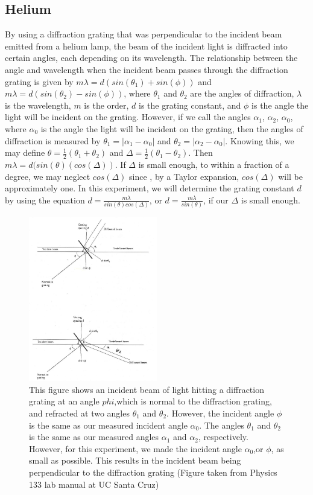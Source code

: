 \documentclass[a4paper]{article}
\begin{document}
\subsection{Helium}
By using a diffraction grating that was perpendicular to the incident beam emitted from a helium lamp, the beam of the incident light is diffracted into certain angles, each depending on its wavelength. The relationship between the angle and wavelength when the incident beam passes through the diffraction grating is given by $m\lambda = d(sin(\theta_1) + sin(\phi))$ and $m\lambda = d(sin(\theta_2) - sin(\phi))$, where $\theta_1$ and $\theta_2$ are the angles of diffraction, $\lambda$ is the wavelength, $m$ is the order, $d$ is the grating constant, and $\phi$ is the angle the light will be incident on the grating. However, if we call the angles $\alpha_1$, $\alpha_2$, $\alpha_0$, where  $\alpha_0$ is the angle the light will be incident on the grating, then the angles of diffraction is measured by $\theta_1 = |\alpha_1 -\alpha_0|$ and $\theta_2 = |\alpha_2 -\alpha_0|$. Knowing this, we may define $\theta = \frac{1}{2}(\theta_1 + \theta_2)$ and $\Delta = \frac{1}{2}(\theta_1-\theta_2)$. Then $m\lambda = d(sin(\theta)(cos(\Delta))$. If $\Delta$ is small enough, to within a fraction of a degree, we may neglect $cos(\Delta)$ since , by a Taylor expansion, $cos(\Delta)$ will be approximately one. In this experiment, we will determine the grating constant $d$ by using the equation $d = \frac{m\lambda}{sin(\theta)cos(\Delta)}$, or $d =\frac{m \lambda}{sin(\theta)}$, if our $\Delta$ is small enough.
\begin{figure}[h]
\centering
\includegraphics[width=0.5\textwidth]{1}
\caption{This figure shows an incident beam of light hitting a diffraction grating at an angle $phi$,which is normal to the diffraction grating, and refracted at two angles $\theta_1$ and $\theta_2$. However, the incident angle $\phi$ is the same as our measured incident angle $\alpha_0$. The angles $\theta_1$ and $\theta_2$ is the same as our measured angles $\alpha_1$ and $\alpha_2$, respectively. However, for this experiment, we made the incident angle $\alpha_0$,or $\phi$, as small as possible. This results in the incident beam being perpendicular to the diffraction grating  (Figure taken from Physics 133 lab manual at UC Santa Cruz)}
\end{figure}
\end{document}
